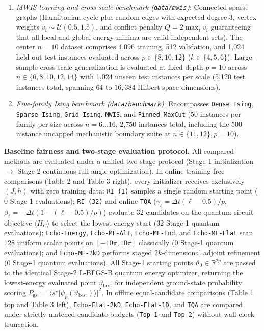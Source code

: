 \documentclass[10pt,a4paper]{article}
\begin{document}
\begin{enumerate}\setlength{\itemsep}{1pt}\setlength{\parskip}{1pt}\setlength{\topsep}{2pt}
\item \emph{MWIS learning and cross-scale benchmark (\texttt{data/mwis})}: Connected sparse graphs (Hamiltonian cycle plus random edges with expected degree $3$, vertex weights $v_i \sim \mathcal{U}(0.5, 1.5)$, and conflict penalty $Q = 2\max_i v_i$ guaranteeing that all local and global energy minima are valid independent sets). The center $n = 10$ dataset comprises 4,096 training, 512 validation, and 1,024 held-out test instances evaluated across $p \in \{8, 10, 12\}$ ($k \in \{4, 5, 6\}$). Large-sample cross-scale generalization is evaluated at fixed depth $p = 10$ across $n \in \{6, 8, 10, 12, 14\}$ with 1,024 unseen test instances per scale (5,120 test instances total, spanning $64$ to $16{,}384$ Hilbert-space dimensions).
\item \emph{Five-family Ising benchmark (\texttt{data/benchmark})}: Encompasses \texttt{Dense Ising}, \texttt{Sparse Ising}, \texttt{Grid Ising}, \texttt{MWIS}, and \texttt{Pinned MaxCut} (50 instances per family per size across $n = 6\ldots 16$, 2,750 instances total, including the 500-instance uncapped mechanistic boundary suite at $n \in \{11, 12\}, p = 10$).

\end{enumerate}
\textbf{Baseline fairness and two-stage evaluation protocol.} All compared methods are evaluated under a unified two-stage protocol (Stage-1 initialization $\rightarrow$ Stage-2 continuous full-angle optimization). In online training-free comparisons (Table 2 and Table 3 right), every initializer receives exclusively $(J, h)$ with zero training data: \texttt{RI (1)} samples a single random starting point ($0$ Stage-1 evaluations); \texttt{RI (32)} and online \texttt{TQA} ($\gamma_\ell = \Delta t(\ell - 0.5)/p$, $\beta_\ell = -\Delta t(1 - (\ell - 0.5)/p)$) evaluate 32 candidates on the quantum circuit objective $\langle H_C \rangle$ to select the lowest-energy start ($32$ Stage-1 quantum evaluations); \texttt{Echo-Energy}, \texttt{Echo-MF-Alt}, \texttt{Echo-MF-End}, and \texttt{Echo-MF-Flat} scan 128 uniform scalar points on $[-10\pi, 10\pi]$ classically ($0$ Stage-1 quantum evaluations); and \texttt{Echo-MF-2kD} performs staged $2k$-dimensional adjoint refinement ($0$ Stage-1 quantum evaluations). All Stage-1 starting points $\vartheta_0 \in \mathbb{R}^{2p}$ are passed to the identical Stage-2 L-BFGS-B quantum energy optimizer, returning the lowest-energy evaluated point $\vartheta_{\mathrm{best}}$ for independent ground-state probability scoring $P_{\mathrm{gs}} = |\langle s^\star | \psi_p(\vartheta_{\mathrm{best}}) \rangle|^2$. In offline equal-candidate comparisons (Table 1 top and Table 3 left), \texttt{Echo-Flat-2kD}, \texttt{Echo-Flat-1D}, and \texttt{TQA} are compared under strictly matched candidate budgets (\texttt{Top-1} and \texttt{Top-2}) without wall-clock truncation.
\end{document}
